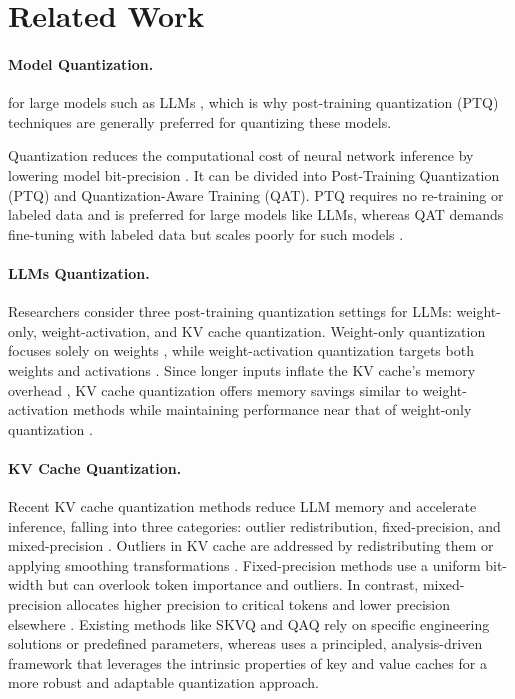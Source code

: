 \section{Related Work}
\label{sec:related}

\paragraph{Model Quantization.} 
 for large models such as LLMs \cite{efficientllm}, which is why post-training quantization (PTQ) techniques are generally preferred for quantizing these models.

Quantization reduces the computational cost of neural network inference by lowering model bit-precision \cite{deepcompression, whitepaperquant}. It can be divided into Post-Training Quantization (PTQ) and Quantization-Aware Training (QAT). PTQ requires no re-training or labeled data \cite{quantizationtrainingneuralnetworks, datafreequantizationweightequalization} and is preferred for large models like LLMs, whereas QAT demands fine-tuning with labeled data \cite{whitepaperquant, surveyquantizationmethodsefficient} but scales poorly for such models \cite{efficientllm}.

\paragraph{LLMs Quantization.} 


Researchers consider three post-training quantization settings for LLMs: weight-only, weight-activation, and KV cache quantization. Weight-only quantization focuses solely on weights \cite{gptq, obq, awq}, while weight-activation quantization targets both weights and activations \cite{llmint8, smoothquant, omniquant}. Since longer inputs inflate the KV cache’s memory overhead \cite{efficientlyscalingtransformerinference}, KV cache quantization offers memory savings similar to weight-activation methods while maintaining performance near that of weight-only quantization \cite{wkvquant}.

\paragraph{KV Cache Quantization.} 

Recent KV cache quantization methods reduce LLM memory and accelerate inference, falling into three categories: outlier redistribution, fixed-precision, and mixed-precision \cite{kvcachequantsurvey}. Outliers in KV cache are addressed by redistributing them or applying smoothing transformations \cite{smoothquant, awq, omniquant}. Fixed-precision methods use a uniform bit-width \cite{zeroquant, flexgen, kivi} but can overlook token importance and outliers. In contrast, mixed-precision allocates higher precision to critical tokens and lower precision elsewhere \cite{kvquant, wkvquant, snapkv, qaq, skvq}.
Existing methods like SKVQ and QAQ rely on specific engineering solutions or predefined parameters, whereas \mn{} uses a principled, analysis-driven framework that leverages the intrinsic properties of key and value caches for a more robust and adaptable quantization approach.